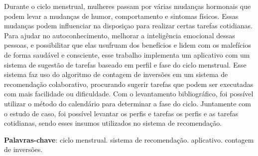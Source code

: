 \begin{resumo}

    Durante o ciclo menstrual, mulheres passam por várias mudanças hormonais que podem levar a 
    mudanças de humor, comportamento e sintomas físicos. Essas mudanças podem influenciar na 
    disposiçao para realizar certas tarefas cotidianas. Para 
    ajudar no autoconhecimento, melhorar a inteligência emocional 
    dessas pessoas, e possibilitar que elas usufruam dos benefícios e lidem com os 
    malefícios 
    de forma saudável e consciente, esse trabalho implementa um aplicativo com um sistema de 
    sugestão de tarefas baseado em 
    perfil e fase do ciclo menstrual. Esse sistema faz uso do algoritmo de contagem de inversões
    em um sistema de recomendação colaborativo, procurando sugerir tarefas 
    que podem ser executadas com mais facilidade ou dificuldade. Com o levantamento bibliográfico, 
    foi possível utilizar o método do calendário para determinar a fase do ciclo. Juntamente com o 
    estudo de caso, foi possível levantar os perfis e tarefas os perfis e as tarefas cotidianas, 
    sendo esses insumos utilizados no sistema de recomendação.
    
     \vspace{\onelineskip}
        
     \noindent
     \textbf{Palavras-chave}: ciclo menstrual. sistema de recomendação. aplicativo. contagem de inversões.
    \end{resumo}
    
